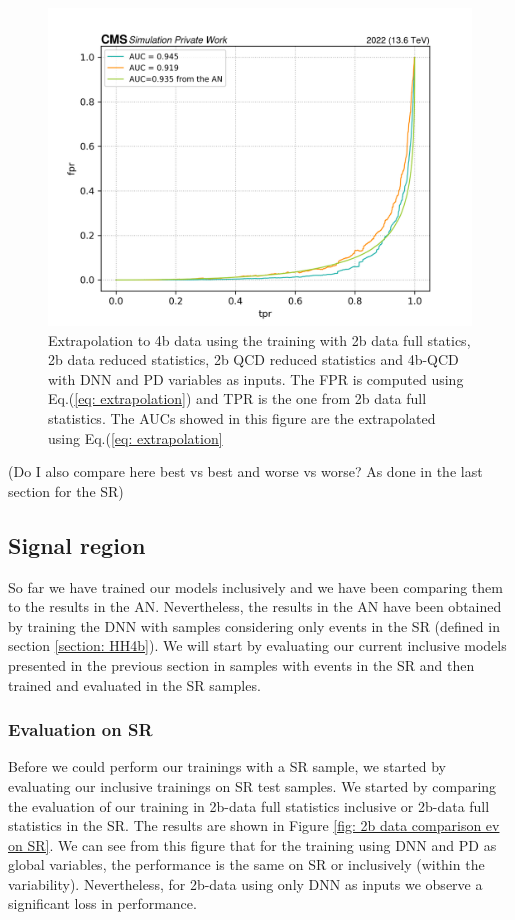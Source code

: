 \begin{figure}[hbt]
    \centering
    \includegraphics[width=0.7\linewidth]{Images/7.S:B/Extrapolation/4b data dnn proba.png}
    \caption{Extrapolation to 4b data using the training with 2b data full statics, 2b data reduced statistics, 2b QCD reduced statistics and 4b-QCD with DNN and PD variables as inputs. The FPR is computed using Eq.(\ref{eq: extrapolation}) and TPR is the one from 2b data full statistics. The AUCs showed in this figure are the extrapolated using Eq.(\ref{eq: extrapolation}}
    \label{fig: 4b data extrapolation DNN PD}
\end{figure}

(Do I also compare here best vs best and worse vs worse? As done in the last section for the SR)

\clearpage

\subsection{Signal region}

So far we have trained our models inclusively and we have been comparing them to the results in the AN. Nevertheless, the results in the AN have been obtained by training the DNN with samples considering only events in the SR (defined in section \ref{section: HH4b}). We will start by evaluating our current inclusive models presented in the previous section in samples with events in the SR and then trained and evaluated in the SR samples.


\subsubsection{Evaluation on SR}

Before we could perform our trainings with a SR sample, we started by evaluating our inclusive trainings on SR test samples. We started by comparing the evaluation of our training in 2b-data full statistics inclusive or 2b-data full statistics in the SR. The results are shown in Figure \ref{fig: 2b data comparison ev on SR}. We can see from this figure that for the training using DNN and PD as global variables, the performance is the same on SR or inclusively (within the variability). Nevertheless, for 2b-data using only DNN as inputs we observe a significant loss in performance.

